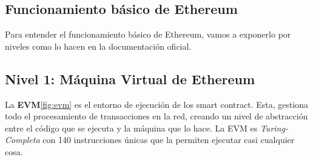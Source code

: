 % 
% 
% 
% 
% 

\subsection{Funcionamiento básico de Ethereum}

Para entender el funcionamiento básico de Ethereum, vamos a exponerlo por niveles como lo hacen en la documentación oficial\cite{etherStack}. 

\subsection{Nivel 1: Máquina Virtual de Ethereum} 

La \textbf{EVM}\ref{fig:evm} es el entorno de ejecución de los smart contract. Esta, gestiona todo el procesamiento de transacciones en la red, creando un nivel de abstracción entre el código que se ejecuta y la máquina que lo hace. La EVM es \emph{Turing-Completa} con 140 instrucciones únicas que la permiten ejecutar casi cualquier cosa. 

